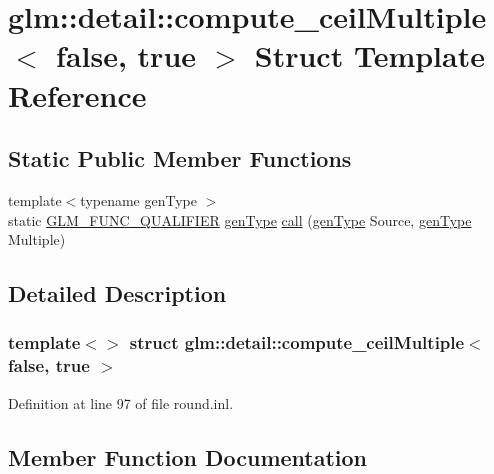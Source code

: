 \hypertarget{structglm_1_1detail_1_1compute__ceil_multiple_3_01false_00_01true_01_4}{}\section{glm\+::detail\+::compute\+\_\+ceil\+Multiple$<$ false, true $>$ Struct Template Reference}
\label{structglm_1_1detail_1_1compute__ceil_multiple_3_01false_00_01true_01_4}
\subsection*{Static Public Member Functions}
\begin{DoxyCompactItemize}
\item 
{\footnotesize template$<$typename gen\+Type $>$ }\\static \mbox{\hyperlink{setup_8hpp_a33fdea6f91c5f834105f7415e2a64407}{G\+L\+M\+\_\+\+F\+U\+N\+C\+\_\+\+Q\+U\+A\+L\+I\+F\+I\+ER}} \mbox{\hyperlink{structglm_1_1detail_1_1gen_type}{gen\+Type}} \mbox{\hyperlink{structglm_1_1detail_1_1compute__ceil_multiple_3_01false_00_01true_01_4_a065f8762eb2b48c4f746781fac7ab7f7}{call}} (\mbox{\hyperlink{structglm_1_1detail_1_1gen_type}{gen\+Type}} Source, \mbox{\hyperlink{structglm_1_1detail_1_1gen_type}{gen\+Type}} Multiple)
\end{DoxyCompactItemize}


\subsection{Detailed Description}
\subsubsection*{template$<$$>$\newline
struct glm\+::detail\+::compute\+\_\+ceil\+Multiple$<$ false, true $>$}



Definition at line 97 of file round.\+inl.



\subsection{Member Function Documentation}
\mbox{\label{structglm_1_1detail_1_1compute__ceil_multiple_3_01false_00_01true_01_4_a065f8762eb2b48c4f746781fac7ab7f7}} 
